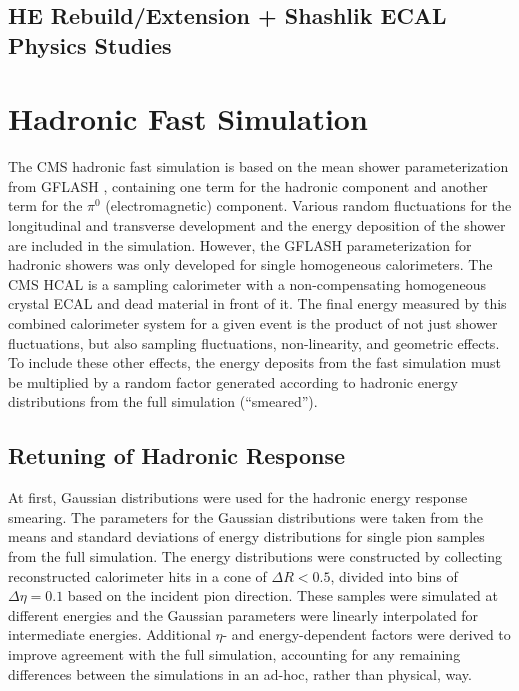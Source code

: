 \subsection{HE Rebuild/Extension + Shashlik ECAL Physics Studies}


\section{Hadronic Fast Simulation}

The CMS hadronic fast simulation is based on the mean shower parameterization from GFLASH \cite{gflash}, containing one term for the hadronic component and another term for the $\pi^{0}$ (electromagnetic) component. Various random fluctuations for the longitudinal and transverse development and the energy deposition of the shower are included in the simulation. However, the GFLASH parameterization for hadronic showers was only developed for single homogeneous calorimeters. The CMS HCAL is a sampling calorimeter with a non-compensating homogeneous crystal ECAL and dead material in front of it. The final energy measured by this combined calorimeter system for a given event is the product of not just shower fluctuations, but also sampling fluctuations, non-linearity, and geometric effects. To include these other effects, the energy deposits from the fast simulation must be multiplied by a random factor generated according to hadronic energy distributions from the full simulation (``smeared'').

\subsection{Retuning of Hadronic Response}

At first, Gaussian distributions were used for the hadronic energy response smearing. The parameters for the Gaussian distributions were taken from the means and standard deviations of energy distributions for single pion samples from the full simulation. The energy distributions were constructed by collecting reconstructed calorimeter hits in a cone of $\Delta R < 0.5$, divided into bins of $\Delta \eta = 0.1$ based on the incident pion direction. These samples were simulated at different energies and the Gaussian parameters were linearly interpolated for intermediate energies. Additional $\eta$- and energy-dependent factors were derived to improve agreement with the full simulation, accounting for any remaining differences between the simulations in an ad-hoc, rather than physical, way.

